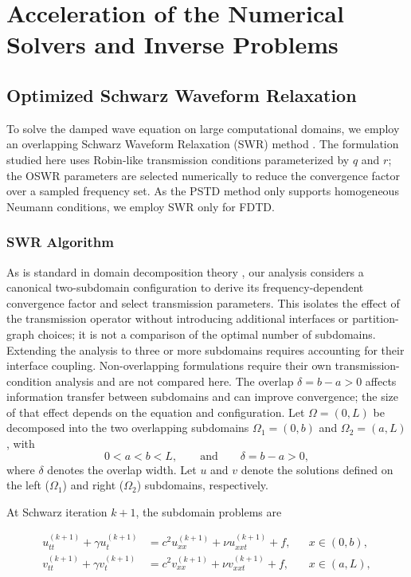 \documentclass{Configuration_Files/PoliMi3i_thesis}
\newif\ifshowthesischanges
\DeclareRobustCommand{\thesischange}[2]{%
    \ifshowthesischanges
        \textcolor{#1}{#2}%
    \else
        #2%
    \fi
}
\def\thesischange#1#2{#2}%
\begin{document}
\chapter{Acceleration of the Numerical Solvers and Inverse Problems}
\label{ch:acceleration}

\section{Optimized Schwarz Waveform Relaxation}
\label{sec:oswr}

To solve the damped wave equation on large computational domains, we employ an overlapping Schwarz Waveform Relaxation (SWR) method \citep{gander_optimal_2003}. \thesischange{red}{The formulation studied here uses Robin-like transmission conditions parameterized by $q$ and $r$; the OSWR parameters are selected numerically to reduce the convergence factor over a sampled frequency set.} As the PSTD method only supports homogeneous Neumann conditions, we employ SWR only for FDTD.

\subsection{SWR Algorithm}
\thesischange{red}{As is standard in domain decomposition theory \citep{quarteroni_domain_1999,gander_optimized_2007,dolean_introduction_2015}, our analysis considers a canonical two-subdomain configuration to derive its frequency-dependent convergence factor and select transmission parameters. This isolates the effect of the transmission operator without introducing additional interfaces or partition-graph choices; it is not a comparison of the optimal number of subdomains. Extending the analysis to three or more subdomains requires accounting for their interface coupling. Non-overlapping formulations require their own transmission-condition analysis and are not compared here. The overlap $\delta=b-a>0$ affects information transfer between subdomains and can improve convergence; the size of that effect depends on the equation and configuration.}
Let $\Omega=(0,L)$ be decomposed into the two overlapping subdomains $\Omega_1=(0,b)$ and $\Omega_2=(a,L)$, with
\[
0<a<b<L,
\qquad \text{and} \qquad
\delta=b-a>0,
\]
where $\delta$ denotes the overlap width. Let $u$ and $v$ denote the solutions defined on the left ($\Omega_1$) and right ($\Omega_2$) subdomains, respectively.

At Schwarz iteration $k+1$, the subdomain problems are

\begin{align*}
u_{tt}^{(k+1)}
+\gamma u_t^{(k+1)}
&=
c^2u_{xx}^{(k+1)}
+\nu u_{xxt}^{(k+1)}
+f,
&&x\in(0,b),
\\
v_{tt}^{(k+1)}
+\gamma v_t^{(k+1)}
&=
c^2v_{xx}^{(k+1)}
+\nu v_{xxt}^{(k+1)}
+f,
&&x\in(a,L),
\end{align*}
\end{document}
